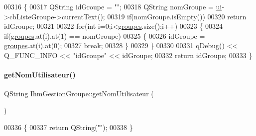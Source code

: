 \begin{DoxyCode}
00316 \{
00317     QString idGroupe = \textcolor{stringliteral}{""};
00318     QString nomGroupe = \hyperlink{class_ihm_gestion_groupe_a9785ad3dadc1d2cad8558ca8b682dffd}{ui}->cbListeGroupe->currentText();
00319     \textcolor{keywordflow}{if}(nomGroupe.isEmpty())
00320         \textcolor{keywordflow}{return} idGroupe;
00321 
00322     \textcolor{keywordflow}{for}(\textcolor{keywordtype}{int} i=0;i<\hyperlink{class_ihm_gestion_groupe_af2d05c88db3e19452e70727446635bc4}{groupes}.size();i++)
00323     \{
00324         \textcolor{keywordflow}{if}(\hyperlink{class_ihm_gestion_groupe_af2d05c88db3e19452e70727446635bc4}{groupes}.at(i).at(1) == nomGroupe)
00325         \{
00326             idGroupe = \hyperlink{class_ihm_gestion_groupe_af2d05c88db3e19452e70727446635bc4}{groupes}.at(i).at(0);
00327             \textcolor{keywordflow}{break};
00328         \}
00329     \}
00330 
00331     qDebug() << Q\_FUNC\_INFO << \textcolor{stringliteral}{"idGroupe"} << idGroupe;
00332     \textcolor{keywordflow}{return} idGroupe;
00333 \}
\end{DoxyCode}
\mbox{\label{class_ihm_gestion_groupe_ae214f51e88aeb029e6956eb833f7542c}} 
\paragraph{\texorpdfstring{get\+Nom\+Utilisateur()}{getNomUtilisateur()}}
{\footnotesize\ttfamily Q\+String Ihm\+Gestion\+Groupe\+::get\+Nom\+Utilisateur (\begin{DoxyParamCaption}{ }\end{DoxyParamCaption})\hspace{0.3cm}{\ttfamily [private]}}


\begin{DoxyCode}
00336 \{
00337     \textcolor{keywordflow}{return} QString(\textcolor{stringliteral}{""});
00338 \}
\end{DoxyCode}
\mbox{\label{class_ihm_gestion_groupe_a7206d6ced32c6c5e8be7ee474195ca73}} 
